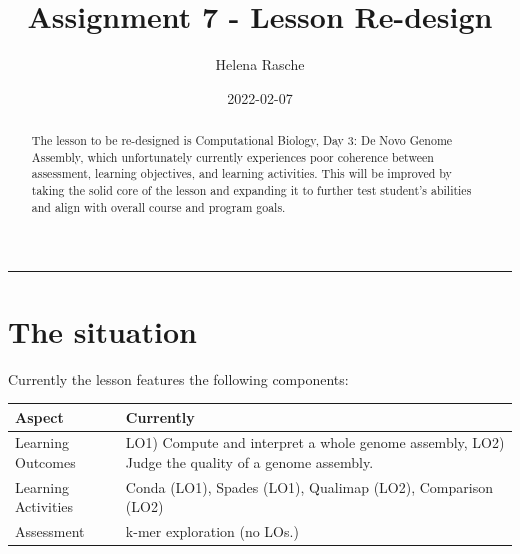 \documentclass[paper=a4,justified,a4paper]{tufte-handout}
\title[A7 - Lesson Re-design]{Assignment 7 - Lesson Re-design}
\author{Helena Rasche}
\date{2022-02-07}
\begin{document}
\maketitle
\begin{abstract}
The lesson to be re-designed is Computational Biology, Day 3: De Novo
Genome Assembly, which unfortunately currently experiences poor
coherence between assessment, learning objectives, and learning
activities. This will be improved by taking the solid core of the lesson
and expanding it to further test student's abilities and align with
overall course and program goals.
\end{abstract}
\noindent\rule{5in}{0.4pt}


\hypertarget{the-situation}{%
\section{The situation}\label{the-situation}}

Currently the lesson features the following components:

\begin{longtable}[]{@{}ll@{}}
\toprule
\begin{minipage}[b]{0.31\columnwidth}\raggedright
Aspect\strut
\end{minipage} & \begin{minipage}[b]{0.63\columnwidth}\raggedright
Currently\strut
\end{minipage}\tabularnewline
\midrule
\endhead
\begin{minipage}[t]{0.31\columnwidth}\raggedright
Learning Outcomes\strut
\end{minipage} & \begin{minipage}[t]{0.63\columnwidth}\raggedright
LO1) Compute and interpret a whole genome assembly, LO2) Judge the
quality of a genome assembly.\strut
\end{minipage}\tabularnewline
\begin{minipage}[t]{0.31\columnwidth}\raggedright
Learning Activities\strut
\end{minipage} & \begin{minipage}[t]{0.63\columnwidth}\raggedright
Conda (LO1), Spades (LO1), Qualimap (LO2), Comparison (LO2)\strut
\end{minipage}\tabularnewline
\begin{minipage}[t]{0.31\columnwidth}\raggedright
Assessment\strut
\end{minipage} & \begin{minipage}[t]{0.63\columnwidth}\raggedright
k-mer exploration (no LOs.)\strut
\end{minipage}\tabularnewline
\bottomrule
\end{longtable}
\end{document}
